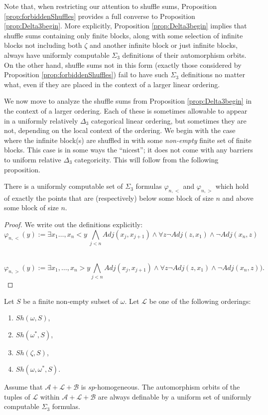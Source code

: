 \documentclass[11pt]{amsart}
\theoremstyle{definition}
\def\A{\mathcal A}
\def\B{\mathcal{B}}
\def\L{\mathcal L}
\begin{document}
Note that, when restricting our attention to shuffle sums, Proposition \ref{prop:forbiddenShuffles} provides a full converse to Proposition \ref{prop:Delta3begin}.
More explicitly, Proposition \ref{prop:Delta3begin} implies that shuffle sums containing only finite blocks, along with some selection of infinite blocks not including both $\zeta$ and another infinite block or just infinite blocks, always have uniformly computable $\Sigma_3$ definitions of their automorphism orbits.
On the other hand, shuffle sums not in this form (exactly those considered by Proposition \ref{prop:forbiddenShuffles}) fail to have such $\Sigma_3$ definitions no matter what, even if they are placed in the context of a larger linear ordering.

We now move to analyze the shuffle sums from Proposition \ref{prop:Delta3begin} in the context of a larger ordering.
Each of these is sometimes allowable to appear in a uniformly relatively $\Delta_3$ categorical linear ordering, but sometimes they are not, depending on the local context of the ordering.
We begin with the case where the infinite block(s) are shuffled in with some \textit{non-empty} finite set of finite blocks.
This case is in some ways the ``nicest''; it does not come with any barriers to uniform relative $\Delta_3$ categoricity.
This will follow from the following proposition.

\begin{proposition}\label{prop:Sigma3blockabove}
    There is a uniformly computable set of $\Sigma_3$ formulas $\varphi_{n,<}$ and $\varphi_{n,>}$ which hold of exactly the points that are (respectively) below some block of size $n$ and above some block of size $n$.
\end{proposition}
\begin{proof}
    We write out the definitions explicitly:
    \[\varphi_{n,<}(y):= \exists x_1\dots, x_n<y\ \bigwedge_{j<n} Adj(x_j,x_{j+1})\land \forall z \lnot Adj(z,x_1)\land \lnot Adj(x_n,z)\]\
    
    \[\varphi_{n,>}(y):=\exists x_1,\dots,x_n>y \bigwedge_{j<n} Adj(x_j,x_{j+1})\land \forall z \lnot Adj(z,x_1)\land \lnot Adj(x_n,z)).\]
    
    \end{proof}

\begin{corollary}
        Let $S$ be a finite non-empty subset of $\omega$.
    Let $\L$ be one of the following orderings:
    \begin{enumerate}
        \item $Sh(\omega,S)$,
        \item $Sh(\omega^*,S)$,
        \item $Sh(\zeta,S)$,
        \item $Sh(\omega,\omega^*,S)$.
    \end{enumerate}
    Assume that $\A+\L+\B$ is $sp$-homogeneous. The automorphism orbits of the tuples of $\L$ within $\A+\L+\B$ are always definable by a uniform set of uniformly computable $\Sigma_3$ formulas.
\end{corollary}
\end{document}
